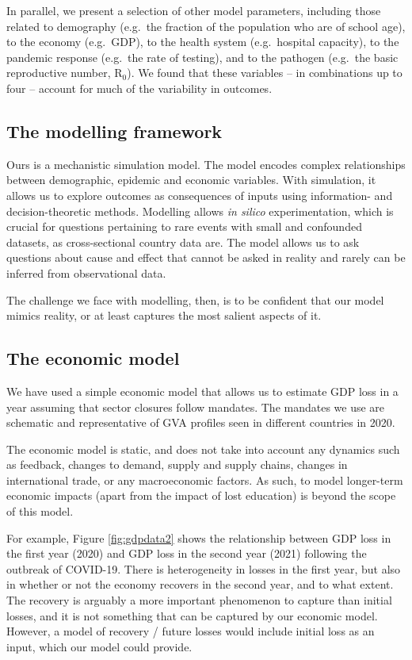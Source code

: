 \documentclass[
]{article}
\begin{document}
In parallel, we present a selection of other model parameters, including those related to demography (e.g.~the fraction of the population who are of school age), to the economy (e.g.~GDP), to the health system (e.g.~hospital capacity), to the pandemic response (e.g.~the rate of testing), and to the pathogen (e.g.~the basic reproductive number, R\(_0\)). We found that these variables -- in combinations up to four -- account for much of the variability in outcomes.

\hypertarget{the-modelling-framework}{%
\subsection{The modelling framework}\label{the-modelling-framework}}

Ours is a mechanistic simulation model. The model encodes complex relationships between demographic, epidemic and economic variables. With simulation, it allows us to explore outcomes as consequences of inputs using information- and decision-theoretic methods. Modelling allows \emph{in silico} experimentation, which is crucial for questions pertaining to rare events with small and confounded datasets, as cross-sectional country data are. The model allows us to ask questions about cause and effect that cannot be asked in reality and rarely can be inferred from observational data.

The challenge we face with modelling, then, is to be confident that our model mimics reality, or at least captures the most salient aspects of it.

\hypertarget{the-economic-model}{%
\subsection{The economic model}\label{the-economic-model}}

We have used a simple economic model that allows us to estimate GDP loss in a year assuming that sector closures follow mandates. The mandates we use are schematic and representative of GVA profiles seen in different countries in 2020.

The economic model is static, and does not take into account any dynamics such as feedback, changes to demand, supply and supply chains, changes in international trade, or any macroeconomic factors. As such, to model longer-term economic impacts (apart from the impact of lost education) is beyond the scope of this model.

For example, Figure \ref{fig:gdpdata2} shows the relationship between GDP loss in the first year (2020) and GDP loss in the second year (2021) following the outbreak of COVID-19. There is heterogeneity in losses in the first year, but also in whether or not the economy recovers in the second year, and to what extent. The recovery is arguably a more important phenomenon to capture than initial losses, and it is not something that can be captured by our economic model. However, a model of recovery / future losses would include initial loss as an input, which our model could provide.
\end{document}
